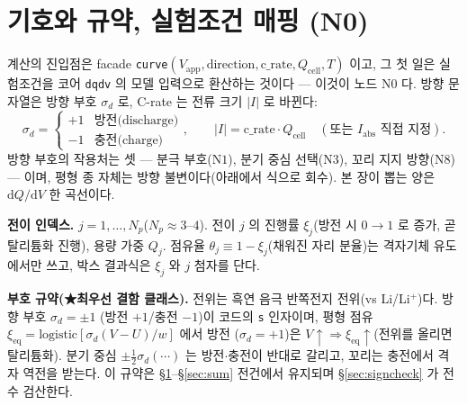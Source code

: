 \documentclass[11pt,a4paper]{article}
\newcommand{\dd}{\mathrm{d}}
\newcommand{\eq}{\mathrm{eq}}
\newcommand{\app}{\mathrm{app}}
\newcommand{\cell}{\mathrm{cell}}
\newcommand{\code}[1]{\texttt{#1}}
\begin{document}
\tableofcontents
\newpage

\section{기호와 규약, 실험조건 매핑 (N0)}\label{sec:notation}
계산의 진입점은 facade \code{curve}$(V_\app,\text{direction},\text{c\_rate},Q_\cell,T)$ 이고, 그 첫 일은 실험조건을
코어 \code{dqdv} 의 모델 입력으로 환산하는 것이다 — 이것이 노드 $\mathrm N0$ 다. 방향 문자열은 방향 부호 $\sigma_d$ 로,
C-rate 는 전류 크기 $|I|$ 로 바뀐다:
\begin{equation}
\sigma_d=\begin{cases}+1 & \text{방전(discharge)}\\ -1 & \text{충전(charge)}\end{cases},
\qquad
|I|=\text{c\_rate}\cdot Q_\cell\quad(\text{또는 }I_\mathrm{abs}\text{ 직접 지정}).
\label{eq:n0map}
\end{equation}
방향 부호의 작용처는 셋 — 분극 부호($\mathrm N1$), 분기 중심 선택($\mathrm N3$), 꼬리 지지 방향($\mathrm N8$) — 이며,
평형 종 자체는 방향 불변이다(아래에서 식으로 회수). 본 장이 뽑는 양은 $\dd Q/\dd V$ 한 곡선이다.

\textbf{전이 인덱스.} $j=1,\dots,N_p$($N_p\approx3$--$4$). 전이 $j$ 의 진행률 $\xi_j$(방전 시 $0\to1$ 로 증가, 곧 탈리튬화 진행),
용량 가중 $Q_j$. 점유율 $\theta_j\equiv1-\xi_j$(채워진 자리 분율)는 격자기체 유도에서만 쓰고, 박스 결과식은 $\xi_j$ 와 $j$ 첨자를 단다.

\textbf{부호 규약(★최우선 결함 클래스).} 전위는 흑연 음극 반쪽전지 전위(vs Li/Li$^+$)다. 방향 부호 $\sigma_d=\pm1$
(방전 $+1$/충전 $-1$)이 코드의 \code{s} 인자이며, 평형 점유 $\xi_\eq=\mathrm{logistic}[\sigma_d(V-U)/w]$ 에서 방전
($\sigma_d=+1$)은 $V\!\uparrow\Rightarrow\xi_\eq\!\uparrow$(전위를 올리면 탈리튬화). 분기 중심 $\pm\tfrac12\sigma_d(\cdots)$
는 방전$\cdot$충전이 반대로 갈리고, 꼬리는 충전에서 격자 역전을 받는다. 이 규약은 \S\ref{sec:notation}--\S\ref{sec:sum}
전건에서 유지되며 \S\ref{sec:signcheck} 가 전수 검산한다.
\end{document}
